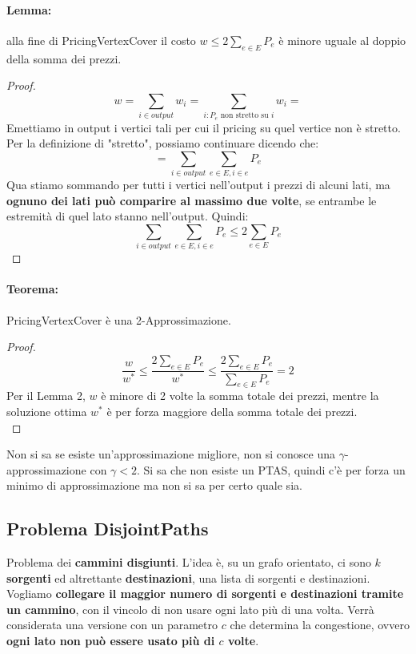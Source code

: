\documentclass[11pt]{article}
\begin{document}
	\paragraph{Lemma:} alla fine di PricingVertexCover il costo $w \leq 2 \sum_{e \in E} P_e$ è minore uguale al doppio della somma dei prezzi. \\
	
	\begin{proof}
		$$ w = \sum_{i \in output} w_i = \sum_{i: P_e \text{ non stretto su } i} w_i = $$
		Emettiamo in output i vertici tali per cui il pricing su quel vertice non è stretto. Per la definizione di "stretto", possiamo continuare dicendo che: 
		$$ = \sum_{i \in output} \sum_{e \in E, i \in e} P_e$$
		Qua stiamo sommando per tutti i vertici nell'output i prezzi di alcuni lati, ma \textbf{ognuno dei lati può comparire al massimo due volte}, se entrambe le estremità di quel lato stanno nell'output. Quindi:
		$$ \sum_{i \in output} \sum_{e \in E, i \in e} P_e \leq 2 \sum_{e \in E} P_e$$
	\end{proof}
	
	\paragraph{Teorema:} PricingVertexCover è una 2-Approssimazione.\\
	
	\begin{proof}
		$$ \frac{w}{w^\ast} \leq \frac{2 \sum_{e \in E} P_e}{w^\ast} \leq \frac{2 \sum_{e \in E} P_e}{\sum_{e \in E} P_e} = 2$$
		Per il Lemma 2, $w$ è minore di 2 volte la somma totale dei prezzi, mentre la soluzione ottima $w^\ast$ è per forza maggiore della somma totale dei prezzi. \\
	\end{proof}
	
	Non si sa se esiste un'approssimazione migliore, non si conosce una $\gamma$-approssimazione con $\gamma < 2$. Si sa che non esiste un PTAS, quindi c'è per forza un minimo di approssimazione ma non si sa per certo quale sia.\\
	
	\newpage
	
	\subsection{Problema DisjointPaths}
	
	Problema dei \textbf{cammini disgiunti}. L'idea è, su un grafo orientato, ci sono $k$ \textbf{sorgenti} ed altrettante \textbf{destinazioni}, una lista di sorgenti e destinazioni. Vogliamo \textbf{collegare il maggior numero di sorgenti e destinazioni tramite un cammino}, con il vincolo di non usare ogni lato più di una volta. Verrà considerata una versione con un parametro $c$ che determina la congestione, ovvero \textbf{ogni lato non può essere usato più di $c$ volte}.\\
	
\end{document}
